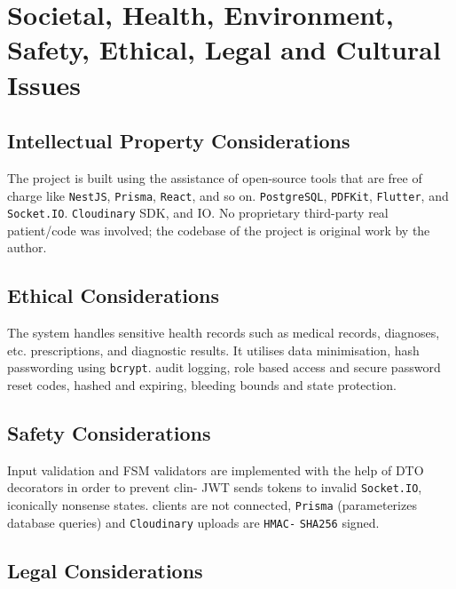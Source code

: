 \documentclass[12pt,a4paper]{report}
\begin{document}
\chapter{Societal, Health, Environment, Safety, Ethical, Legal and Cultural Issues}
\label{chap:societal-issues}

\section{Intellectual Property Considerations}

The project is built using the assistance of open-source tools that are free of charge like \texttt{NestJS}, \texttt{Prisma}, \texttt{React}, and so on.
\texttt{PostgreSQL}, \texttt{PDFKit}, \texttt{Flutter}, and \texttt{Socket.IO}. \texttt{Cloudinary} SDK, and IO. No proprietary third-party
real patient/code was involved; the codebase of the project is original work by the author.

\section{Ethical Considerations}

The system handles sensitive health records such as medical records, diagnoses, etc.
prescriptions, and diagnostic results. It utilises data minimisation, hash passwording using \texttt{bcrypt}.
audit logging, role based access and secure password reset codes, hashed and expiring,
bleeding bounds and state protection.

\section{Safety Considerations}

Input validation and FSM validators are implemented with the help of DTO decorators in order to prevent clin-
JWT sends tokens to invalid \texttt{Socket.IO}, iconically nonsense states. clients are
not connected, \texttt{Prisma} (parameterizes database queries) and \texttt{Cloudinary} uploads are \texttt{HMAC-}
\texttt{SHA256} signed.

\section{Legal Considerations}
\end{document}
